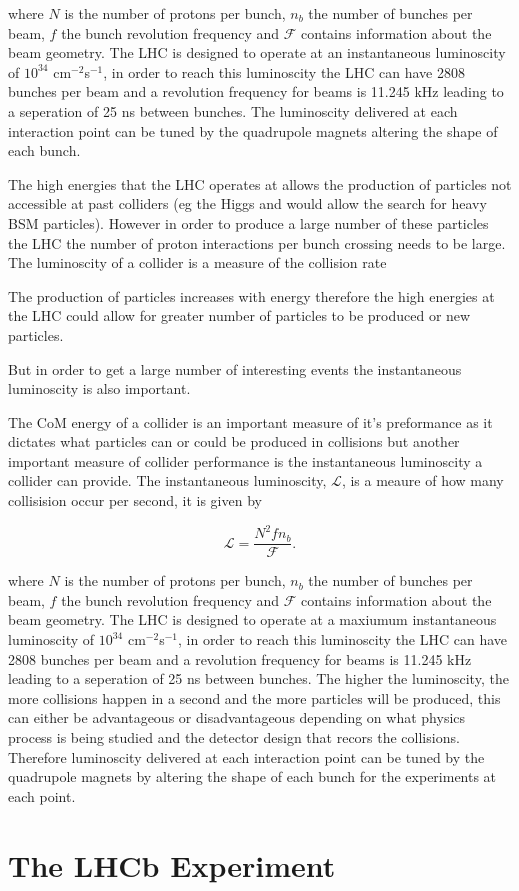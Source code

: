 where $N$ is the number of protons per bunch, $n_{b}$ the number of bunches per beam, $f$ the bunch revolution frequency and $\mathcal{F}$ contains information about the beam geometry. The LHC is designed to operate at an instantaneous luminoscity of $10^{34}$ cm$^{-2}$s$^{-1}$, in order to reach this luminoscity the LHC can have 2808 bunches per beam and a revolution frequency for beams is 11.245 kHz leading to a seperation of 25 ns between bunches. The luminoscity delivered at each interaction point can be tuned by the quadrupole magnets altering the shape of each bunch.


The high energies that the LHC operates at allows the production of particles not accessible at past colliders (eg the Higgs and would allow the search for heavy BSM particles). However in order to produce a large number of these particles the LHC the number of proton interactions per bunch crossing needs to be large. The luminoscity of a collider is a measure of the collision rate

The production of particles increases with energy therefore the high energies at the LHC could allow for greater number of particles to be produced or new particles.










But in order to get a large number of interesting events the instantaneous luminoscity is also important. 


The CoM energy of a collider is an important measure of it's preformance as it dictates what particles can or could be produced in collisions but another important measure of collider performance is the instantaneous luminoscity a collider can provide. The instantaneous luminoscity, $\mathcal{L}$, is a meaure of how many collisision occur per second, it is given by

\begin{equation}
\mathcal{L} = \frac{N^{2} f n_{b}}{\mathcal{F}}.
\label{eq:inst_lumi}
\end{equation}

where $N$ is the number of protons per bunch, $n_{b}$ the number of bunches per beam, $f$ the bunch revolution frequency and $\mathcal{F}$ contains information about the beam geometry. The LHC is designed to operate at a maxiumum instantaneous luminoscity of $10^{34}$ cm$^{-2}$s$^{-1}$, in order to reach this luminoscity the LHC can have 2808 bunches per beam and a revolution frequency for beams is 11.245 kHz leading to a seperation of 25 ns between bunches. The higher the luminoscity, the more collisions happen in a second and the more particles will be produced, this can either be advantageous or disadvantageous depending on what physics process is being studied and the detector design that recors the collisions. Therefore luminoscity delivered at each interaction point can be tuned by the quadrupole magnets by altering the shape of each bunch for the experiments at each point.



\section{The LHCb Experiment}
\label{LHCb}
